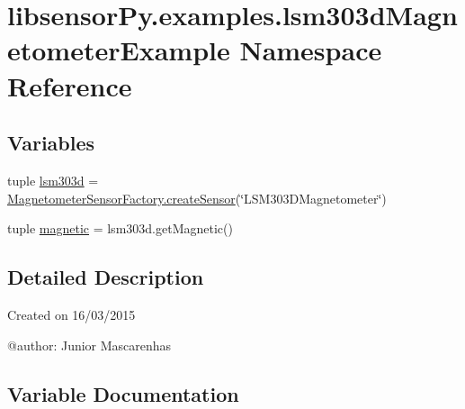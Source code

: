 \hypertarget{namespacelibsensorPy_1_1examples_1_1lsm303dMagnetometerExample}{}\section{libsensor\+Py.\+examples.\+lsm303d\+Magnetometer\+Example Namespace Reference}
\label{namespacelibsensorPy_1_1examples_1_1lsm303dMagnetometerExample}
\subsection*{Variables}
\begin{DoxyCompactItemize}
\item 
tuple \hyperlink{namespacelibsensorPy_1_1examples_1_1lsm303dMagnetometerExample_aaeb5f8cfe647970c1f475fec5671ed77}{lsm303d} = \hyperlink{classconcretefactory_1_1magnetometerSensorFactory_1_1MagnetometerSensorFactory_ab20fa7eddd0b13d22727989f72fa9cde}{Magnetometer\+Sensor\+Factory.\+create\+Sensor}(\char`\"{}L\+S\+M303\+D\+Magnetometer\char`\"{})
\item 
tuple \hyperlink{namespacelibsensorPy_1_1examples_1_1lsm303dMagnetometerExample_a5baf3c52bfcab1106699e95fd1096e30}{magnetic} = lsm303d.\+get\+Magnetic()
\end{DoxyCompactItemize}


\subsection{Detailed Description}
\begin{DoxyVerb}Created on 16/03/2015

@author: Junior Mascarenhas
\end{DoxyVerb}
 

\subsection{Variable Documentation}
\hypertarget{namespacelibsensorPy_1_1examples_1_1lsm303dMagnetometerExample_aaeb5f8cfe647970c1f475fec5671ed77}{}
